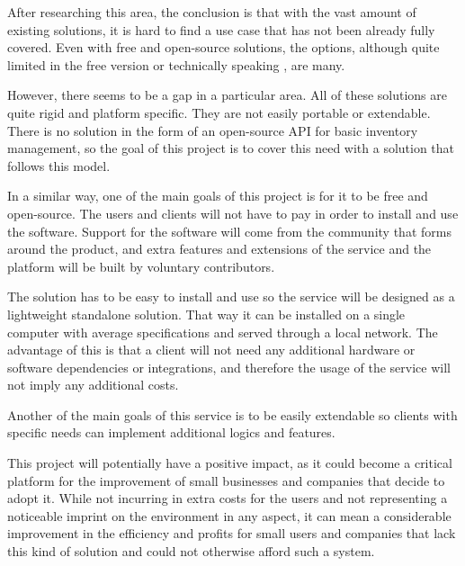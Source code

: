 After researching this area, the conclusion is that with the vast amount of existing solutions, it is hard to find a use case that has not been already fully covered. Even with free and open-source solutions, the options, although quite limited \cite{4,5} in the free version or technically speaking \cite{6}, are many.

However, there seems to be a gap in a particular area. All of these solutions are quite rigid and platform specific. They are not easily portable or extendable. There is no solution in the form of an open-source API for basic inventory management, so the goal of this project is to cover this need with a solution that follows this model.

In a similar way, one of the main goals of this project is for it to be free and open-source. The users and clients will not have to pay in order to install and use the software. Support for the software will come from the community that forms around the product, and extra features and extensions of the service and the platform will be built by voluntary contributors.

The solution has to be easy to install and use so the service will be designed as a lightweight standalone solution. That way it can be installed on a single computer with average specifications and served through a local network. The advantage of this is that a client will not need any additional hardware or software dependencies or integrations, and therefore the usage of the service will not imply any additional costs.

Another of the main goals of this service is to be easily extendable so clients with specific needs can implement additional logics and features.

This project will potentially have a positive impact, as it could become a critical platform for the improvement of small businesses and companies that decide to adopt it. While not incurring in extra costs for the users and not representing a noticeable imprint on the environment in any aspect, it can mean a considerable improvement in the efficiency and profits for small users and companies that lack this kind of solution and could not otherwise afford such a system.